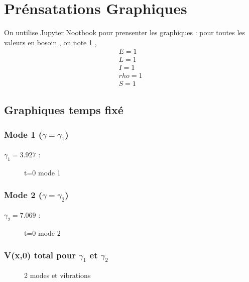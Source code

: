 \documentclass[a4paper,10pt]{report} %
\begin{document}
\chapter{ Prénsatations Graphiques}

On untilise Jupyter Nootbook pour prensenter les graphiques : pour toutes les valeurs en bosoin , on note 1 , 
\begin{align}
    E=1\\
    L=1\\
    I=1\\
    rho=1\\
    S=1
\end{align}

\section{Graphiques temps fixé}

\subsection{Mode 1 ($\gamma=\gamma_1$)}

$\gamma_1=3.927$ :

\begin{figure}[H]
\centering
\label{figure2}
\caption{t=0 mode 1}
\end{figure}

\subsection{Mode 2 ($\gamma=\gamma_2$)}

$\gamma_2=7.069$ :

\begin{figure}[H]
\centering
\label{figure3}
\caption{t=0 mode 2}
\end{figure}

\subsection{V(x,0) total pour $\gamma_1$ et $\gamma_2$}

\begin{figure}[H]
\centering
\label{figure4}
\caption{2 modes et vibrations}
\end{figure}
\end{document}
